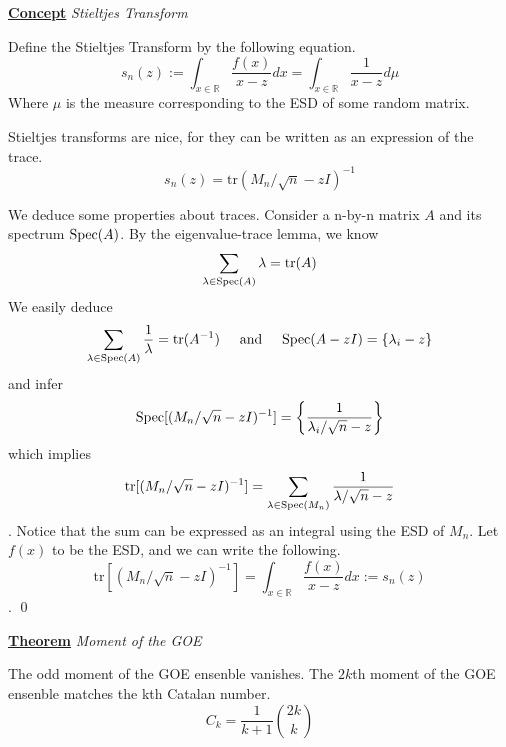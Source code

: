 \documentclass{article}
\newcommand{\new}[2]{
    \vspace{2mm}
    \noindent
    \textbf{
    \underline{#1}}
    \textit{{#2}}
    \vspace{1mm}
    \newline
}
\newcommand{\textAnd}{
    {
        \hspace{5mm}
        \textrm{and}
        \hspace{5mm}
    }
}
\begin{document}
\newcommand{\tr}{
    \text{tr}
}

\new{Concept} {Stieltjes Transform}

Define the Stieltjes Transform by the following equation. 
\[
    s_n(z) := \int_{x \in \mathbb{R}} \frac{f(x)}{x-z}dx 
    = \int_{x \in \mathbb{R}} \frac{1}{x-z}d\mu 
\]
Where $\mu$ is the measure corresponding to the ESD of some random matrix. 

Stieltjes transforms are nice, for they can be written as an expression 
of the trace. 
\[
    s_n(z) = \tr(M_n/\sqrt{n} - zI)^{-1}
\]

\proof
We deduce some properties about traces. Consider a n-by-n matrix 
$A$ and its spectrum $\text{Spec}(A)$. By the eigenvalue-trace lemma, we know 
\[
\sum_{\lambda \in \Sp(A)} \lambda = \tr(A)
\]
We easily deduce 
\[
\sum_{\lambda \in \Sp(A)} \frac 1 \lambda = \tr(A^{-1})
\textAnd 
\Sp(A - z I) = \{\lambda_i - z\}
\]
and infer 
\[
    \text{Spec}[(M_n/\sqrt{n} - zI)^{-1}] = 
    \left\{
        \frac 1 {\lambda_i / \sqrt{n} - z}
    \right\}
\]
which implies 
\[
    \tr[(M_n/\sqrt{n} - zI)^{-1}] = \sum_{\lambda \in \Sp(M_n)}\frac 1 {\lambda / \sqrt{n} - z}
\]. 
Notice that the sum can be expressed as an integral using the ESD of 
$M_n$. Let $f(x)$ to be the ESD, and we can write the following. 
\[
    \tr[(M_n/\sqrt{n} - zI)^{-1}] = 
    \int_{x \in \mathbb{R}}\frac {f(x)} {x - z}dx := s_n(z)
\]. 
\hfill \qed

\newpage

\new{Theorem} {Moment of the GOE}
The odd moment of the GOE ensenble vanishes. The $2k$th moment 
of the GOE ensenble matches the kth Catalan number. 
\[
    C_k = \frac 1 {k + 1} \binom {2k} k
    \]

\proof 
\end{document}
